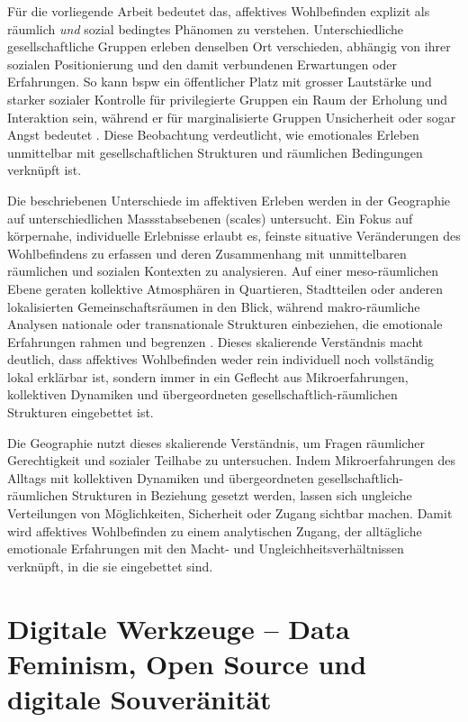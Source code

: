 Für die vorliegende Arbeit bedeutet das, affektives Wohlbefinden explizit als räumlich \emph{und} sozial bedingtes Phänomen zu verstehen. Unterschiedliche gesellschaftliche Gruppen erleben denselben Ort verschieden, abhängig von ihrer sozialen Positionierung und den damit verbundenen Erwartungen oder Erfahrungen. So kann \gls{bspw} ein öffentlicher Platz mit grosser Lautstärke und starker sozialer Kontrolle für privilegierte Gruppen ein Raum der Erholung und Interaktion sein, während er für marginalisierte Gruppen Unsicherheit oder sogar Angst bedeutet \parencite{collectiveSafeSpaceReconceptualization2014}. Diese Beobachtung verdeutlicht, wie emotionales Erleben unmittelbar mit gesellschaftlichen Strukturen und räumlichen Bedingungen verknüpft ist.

Die beschriebenen Unterschiede im affektiven Erleben werden in der Geographie auf unterschiedlichen Massstabsebenen (scales) untersucht. Ein Fokus auf körpernahe, individuelle Erlebnisse erlaubt es, feinste situative Veränderungen des Wohlbefindens zu erfassen und deren Zusammenhang mit unmittelbaren räumlichen und sozialen Kontexten zu analysieren. Auf einer meso-räumlichen Ebene geraten kollektive Atmosphären in Quartieren, Stadtteilen oder anderen lokalisierten Gemeinschaftsräumen in den Blick, während makro-räumliche Analysen nationale oder transnationale Strukturen einbeziehen, die emotionale Erfahrungen rahmen und begrenzen \parencite{howittScaleRelationMusical1998,marstonHumanGeographyScale2005}. Dieses skalierende Verständnis macht deutlich, dass affektives Wohlbefinden weder rein individuell noch vollständig lokal erklärbar ist, sondern immer in ein Geflecht aus Mikroerfahrungen, kollektiven Dynamiken und übergeordneten gesellschaftlich-räumlichen Strukturen eingebettet ist.

Die Geographie nutzt dieses skalierende Verständnis, um Fragen räumlicher Gerechtigkeit und sozialer Teilhabe zu untersuchen. Indem Mikroerfahrungen des Alltags mit kollektiven Dynamiken und übergeordneten gesellschaftlich-räumlichen Strukturen in Beziehung gesetzt werden, lassen sich ungleiche Verteilungen von Möglichkeiten, Sicherheit oder Zugang sichtbar machen. Damit wird affektives Wohlbefinden zu einem analytischen Zugang, der alltägliche emotionale Erfahrungen mit den Macht- und Ungleichheitsverhältnissen verknüpft, in die sie eingebettet sind.

\section{Digitale Werkzeuge -- Data Feminism, Open Source und digitale Souveränität}
\label{sec:datafeminism}

